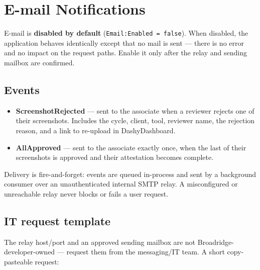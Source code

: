 \documentclass[12pt,a4paper]{report}
\begin{document}
\chapter{E-mail Notifications}
\label{ch:email}

E-mail is \textbf{disabled by default} (\texttt{Email:Enabled = false}). When disabled, the
application behaves identically except that no mail is sent --- there is no error and no impact on
the request paths. Enable it only after the relay and sending mailbox are confirmed.

\section{Events}

\begin{itemize}
  \item \textbf{ScreenshotRejected} --- sent to the associate when a reviewer rejects one of their
        screenshots. Includes the cycle, client, tool, reviewer name, the rejection reason, and a
        link to re-upload in DashyDashboard.
  \item \textbf{AllApproved} --- sent to the associate exactly once, when the last of their
        screenshots is approved and their attestation becomes complete.
\end{itemize}

Delivery is fire-and-forget: events are queued in-process and sent by a background consumer over an
unauthenticated internal SMTP relay. A misconfigured or unreachable relay never blocks or fails a
user request.

\section{IT request template}

The relay host/port and an approved sending mailbox are not Broadridge-developer-owned --- request
them from the messaging/IT team. A short copy-pasteable request:
\end{document}
